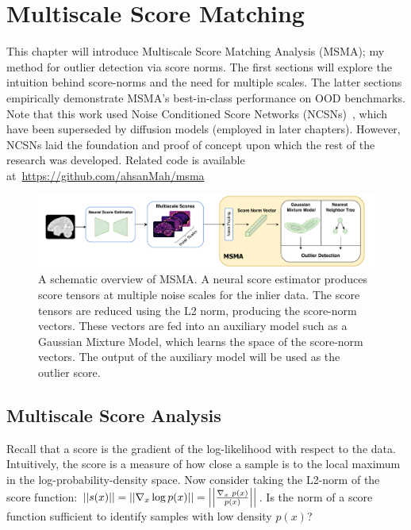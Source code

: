 \chapter{Multiscale Score Matching}
\label{ch:msma}

This chapter will introduce Multiscale Score Matching Analysis (MSMA); my method for outlier detection via score norms. The first sections will explore the intuition behind score-norms and the need for multiple scales. The latter sections empirically demonstrate MSMA's best-in-class performance on OOD benchmarks. Note that this work used Noise Conditioned Score Networks (NCSNs)~\cite{Song2019}, which have been superseded by diffusion models (employed in later chapters). However, NCSNs laid the foundation and proof of concept upon which the rest of the research was developed. Related code is available at~\url{https://github.com/ahsanMah/msma}

\begin{figure}[h]
    \centering
    \includegraphics[width=\textwidth]{figures/msma-schema.pdf}
    \caption{A schematic overview of MSMA. A neural score estimator produces score tensors at multiple noise scales for the inlier data. The score tensors are reduced using the L2 norm, producing the score-norm vectors. These vectors are fed into an auxiliary model such as a Gaussian Mixture Model, which learns the space of the score-norm vectors. The output of the auxiliary model will be used as the outlier score.}
    \label{fig:msma-overview}
\end{figure}

\section{Multiscale Score Analysis}
\label{sec:multiscale}
Recall that a score is the gradient of the log-likelihood with respect to the data. Intuitively, the score is a measure of how close a sample is to the local maximum in the log-probability-density space. Now consider taking the L2-norm of the score function:
$ \left|\left| { s(x) } \right|\right| = \left|\left| { \nabla_{x} \log p(x)  } \right|\right| = \left|\left| { \frac{\nabla_{x}\text{~}p(x)}{p(x)} } \right|\right| $. Is the norm of a score function sufficient to identify samples with low density $p(x)$?

